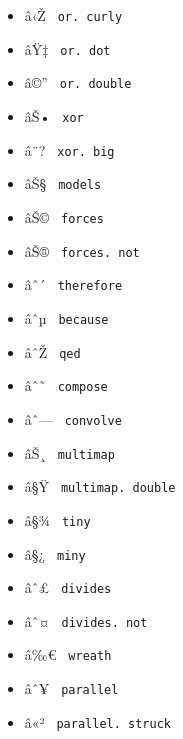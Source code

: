\begin{itemize}
\item
  \label{symbol-or.curly}{{ â‹Ž }
  \texttt{\ or.\ curly\ }}
\item
  \label{symbol-or.dot}{{ âŸ‡ } \texttt{\ or.\ dot\ }}
\item
  \label{symbol-or.double}{{ â©'' }
  \texttt{\ or.\ double\ }}
\item
  \label{symbol-xor}{{ âŠ• } \texttt{\ xor\ }}
\item
  \label{symbol-xor.big}{{ â¨? } \texttt{\ xor.\ big\ }}
\item
  \label{symbol-models}{{ âŠ§ } \texttt{\ models\ }}
\item
  \label{symbol-forces}{{ âŠ© } \texttt{\ forces\ }}
\item
  \label{symbol-forces.not}{{ âŠ® }
  \texttt{\ forces.\ not\ }}
\item
  \label{symbol-therefore}{{ âˆ´ }
  \texttt{\ therefore\ }}
\item
  \label{symbol-because}{{ âˆµ } \texttt{\ because\ }}
\item
  \label{symbol-qed}{{ âˆŽ } \texttt{\ qed\ }}
\item
  \label{symbol-compose}{{ âˆ˜ } \texttt{\ compose\ }}
\item
  \label{symbol-convolve}{{ âˆ--- }
  \texttt{\ convolve\ }}
\item
  \label{symbol-multimap}{{ âŠ¸ } \texttt{\ multimap\ }}
\item
  \label{symbol-multimap.double}{{ â§Ÿ }
  \texttt{\ multimap.\ double\ }}
\item
  \label{symbol-tiny}{{ â§¾ } \texttt{\ tiny\ }}
\item
  \label{symbol-miny}{{ â§¿ } \texttt{\ miny\ }}
\item
  \label{symbol-divides}{{ âˆ£ } \texttt{\ divides\ }}
\item
  \label{symbol-divides.not}{{ âˆ¤ }
  \texttt{\ divides.\ not\ }}
\item
  \label{symbol-wreath}{{ â‰€ } \texttt{\ wreath\ }}
\item
  \label{symbol-parallel}{{ âˆ¥ } \texttt{\ parallel\ }}
\item
  \label{symbol-parallel.struck}{{ â«² }
  \texttt{\ parallel.\ struck\ }}

\end{itemize}
